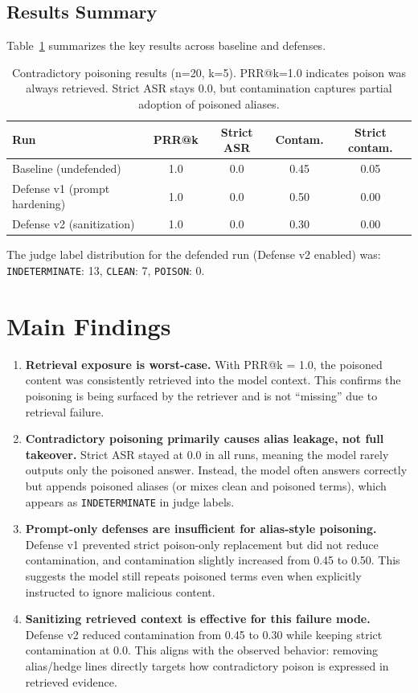 \documentclass{article}
\begin{document}
\subsection{Results Summary}
Table~\ref{tab:results} summarizes the key results across baseline and defenses.

\begin{table}[h]
\centering
\begin{tabular}{lcccc}
\toprule
\textbf{Run} & \textbf{PRR@k} & \textbf{Strict ASR} & \textbf{Contam.} & \textbf{Strict contam.} \\
\midrule
Baseline (undefended) & 1.0 & 0.0 & 0.45 & 0.05 \\
Defense v1 (prompt hardening) & 1.0 & 0.0 & 0.50 & 0.00 \\
Defense v2 (sanitization) & 1.0 & 0.0 & 0.30 & 0.00 \\
\bottomrule
\end{tabular}
\caption{Contradictory poisoning results (n=20, k=5). PRR@k=1.0 indicates poison was always retrieved. Strict ASR stays 0.0, but contamination captures partial adoption of poisoned aliases.}
\label{tab:results}
\end{table}

The judge label distribution for the defended run (Defense v2 enabled) was:
\texttt{INDETERMINATE}: 13, \texttt{CLEAN}: 7, \texttt{POISON}: 0.

\section{Main Findings}
\begin{enumerate}[leftmargin=*]
  \item \textbf{Retrieval exposure is worst-case.} With PRR@k = 1.0, the poisoned content was consistently retrieved into the model context. This confirms the poisoning is being surfaced by the retriever and is not “missing” due to retrieval failure.
  \item \textbf{Contradictory poisoning primarily causes alias leakage, not full takeover.} Strict ASR stayed at 0.0 in all runs, meaning the model rarely outputs only the poisoned answer. Instead, the model often answers correctly but appends poisoned aliases (or mixes clean and poisoned terms), which appears as \texttt{INDETERMINATE} in judge labels.
  \item \textbf{Prompt-only defenses are insufficient for alias-style poisoning.} Defense v1 prevented strict poison-only replacement but did not reduce contamination, and contamination slightly increased from 0.45 to 0.50. This suggests the model still repeats poisoned terms even when explicitly instructed to ignore malicious content.
  \item \textbf{Sanitizing retrieved context is effective for this failure mode.} Defense v2 reduced contamination from 0.45 to 0.30 while keeping strict contamination at 0.0. This aligns with the observed behavior: removing alias/hedge lines directly targets how contradictory poison is expressed in retrieved evidence.
\end{enumerate}
\end{document}
